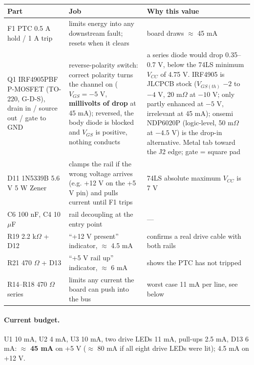 \documentclass[11pt,a4paper]{article}
\begin{document}
\begin{center}
\begin{tabular}{@{}p{40mm}p{62mm}p{58mm}@{}}
\toprule
Part & Job & Why this value\\
\midrule
F1 PTC 0.5 A hold / 1 A trip & limits energy into any downstream fault; resets when it clears & board draws $\approx$ 45 mA\\
Q1 IRF4905PBF P-MOSFET (TO-220, G-D-S), drain in / source out / gate to GND & reverse-polarity switch: correct polarity turns the channel on ($V_{GS} = -5$ V, \textbf{millivolts of drop} at 45 mA); reversed, the body diode is blocked and $V_{GS}$ is positive, nothing conducts & a series diode would drop 0.35--0.7 V, below the 74LS minimum $V_{CC}$ of 4.75 V. IRF4905 is JLCPCB stock ($V_{GS(th)}$ $-2$ to $-4$ V, 20 m$\Omega$ at $-10$ V; only partly enhanced at $-5$ V, irrelevant at 45 mA); onsemi NDP6020P (logic-level, 50 m$\Omega$ at $-4.5$ V) is the drop-in alternative. Metal tab toward the J2 edge; gate = square pad\\
D11 1N5339B 5.6 V 5 W Zener & clamps the rail if the wrong voltage arrives (e.g. +12 V on the +5 V pin) and pulls current until F1 trips & 74LS absolute maximum $V_{CC}$ is 7 V\\
C6 100 nF, C4 10 $\mu$F & rail decoupling at the entry point & ---\\
R19 2.2 k$\Omega$ + D12 & ``+12 V present'' indicator, $\approx$ 4.5 mA & confirms a real drive cable with both rails\\
R21 470 $\Omega$ + D13 & ``+5 V rail up'' indicator, $\approx$ 6 mA & shows the PTC has not tripped\\
R14--R18 470 $\Omega$ series & limits any current the board can push into the bus & worst case 11 mA per line, see below\\
\bottomrule
\end{tabular}
\end{center}

\paragraph{Current budget.} U1 10 mA, U2 4 mA, U3 10 mA, two drive LEDs 11 mA, pull-ups 2.5 mA, D13 6 mA:
$\approx$ \textbf{45 mA} on +5 V ($\approx$ 80 mA if all eight drive LEDs were lit); 4.5 mA on +12 V.
\end{document}
